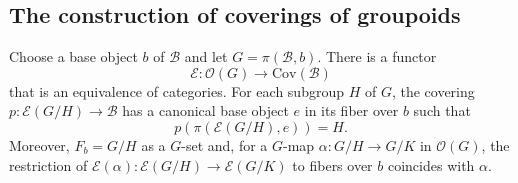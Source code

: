 \subsection{The construction of coverings of groupoids}
\begin{theorem}
Choose a base object $b$ of $\mathcal{B}$ and let $G=\pi(\mathcal{B},b)$. There is a functor
\[\mathscr{E}:\mathcal{O}(G)\to\mathrm{Cov}(\mathcal{B})\]
that is an equivalence of categories. For each subgroup $H$ of $G$, the covering $p:\mathscr{E}(G/H)\to\mathcal{B}$ has a canonical base object $e$ in its fiber over $b$ such that
\[p(\pi(\mathscr{E}(G/H),e))=H.\]
Moreover, $F_b=G/H$ as a $G$-set and, for a $G$-map $\alpha:G/H\to G/K$ in $\mathcal{O}(G)$, the restriction of $\mathscr{E}(\alpha):\mathscr{E}(G/H)\to \mathscr{E}(G/K)$ to fibers over $b$ coincides with $\alpha$.
\end{theorem}
